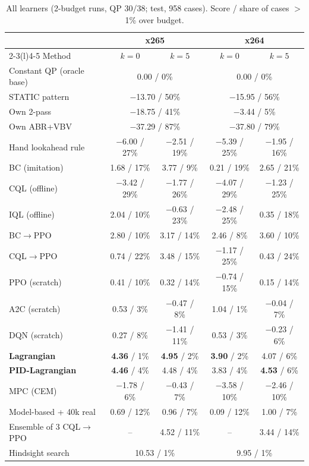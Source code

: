 \documentclass[conference,10pt]{IEEEtran}
\newcommand{\cqlppo}{CQL$\to$PPO}
\newcommand{\bcppo}{BC$\to$PPO}
\begin{document}
\begin{table}[t]
\centering\scriptsize
\caption{All learners (2-budget runs, QP 30/38; test, 958 cases). Score / share of cases $>$1\% over budget.}
\label{tab:methods}
\setlength{\tabcolsep}{2.2pt}
\begin{tabular}{@{}lcccc@{}}
\toprule
& \multicolumn{2}{c}{x265} & \multicolumn{2}{c}{x264}\\
\cmidrule(lr){2-3}\cmidrule(l){4-5}
Method & $k{=}0$ & $k{=}5$ & $k{=}0$ & $k{=}5$\\
\midrule
Constant QP (oracle base) & \multicolumn{2}{c}{0.00 / 0\%} & \multicolumn{2}{c}{0.00 / 0\%}\\
STATIC pattern & \multicolumn{2}{c}{$-$13.70 / 50\%} & \multicolumn{2}{c}{$-$15.95 / 56\%}\\
Own 2-pass & \multicolumn{2}{c}{$-$18.75 / 41\%} & \multicolumn{2}{c}{$-$3.44 / 5\%}\\
Own ABR+VBV & \multicolumn{2}{c}{$-$37.29 / 87\%} & \multicolumn{2}{c}{$-$37.80 / 79\%}\\
Hand lookahead rule & $-$6.00 / 27\% & $-$2.51 / 19\% & $-$5.39 / 25\% & $-$1.95 / 16\%\\
\midrule
BC (imitation) & 1.68 / 17\% & 3.77 / 9\% & 0.21 / 19\% & 2.65 / 21\%\\
CQL (offline) & $-$3.42 / 29\% & $-$1.77 / 26\% & $-$4.07 / 29\% & $-$1.23 / 25\%\\
IQL (offline) & 2.04 / 10\% & $-$0.63 / 23\% & $-$2.48 / 25\% & 0.35 / 18\%\\
\bcppo & 2.80 / 10\% & 3.17 / 14\% & 2.46 / 8\% & 3.60 / 10\%\\
\cqlppo & 0.74 / 22\% & 3.48 / 15\% & $-$1.17 / 25\% & 0.43 / 24\%\\
PPO (scratch) & 0.41 / 10\% & 0.32 / 14\% & $-$0.74 / 15\% & 0.15 / 14\%\\
A2C (scratch) & 0.53 / 3\% & $-$0.47 / 8\% & 1.04 / 1\% & $-$0.04 / 7\%\\
DQN (scratch) & 0.27 / 8\% & $-$1.41 / 11\% & 0.53 / 3\% & $-$0.23 / 6\%\\
\textbf{Lagrangian} & \textbf{4.36} / 1\% & \textbf{4.95} / 2\% & \textbf{3.90} / 2\% & 4.07 / 6\%\\
\textbf{PID-Lagrangian} & \textbf{4.46} / 4\% & 4.48 / 4\% & 3.83 / 4\% & \textbf{4.53} / 6\%\\
MPC (CEM) & $-$1.78 / 6\% & $-$0.43 / 7\% & $-$3.58 / 10\% & $-$2.46 / 10\%\\
Model-based + 40k real & 0.69 / 12\% & 0.96 / 7\% & 0.09 / 12\% & 1.00 / 7\%\\
Ensemble of 3 \cqlppo{} & -- & 4.52 / 11\% & -- & 3.44 / 14\%\\
\midrule
Hindsight search & \multicolumn{2}{c}{10.53 / 1\%} & \multicolumn{2}{c}{9.95 / 1\%}\\
\bottomrule
\end{tabular}
\end{table}
\end{document}
